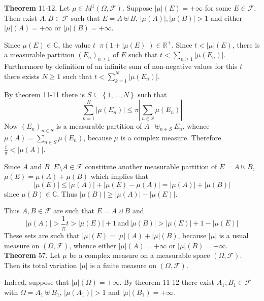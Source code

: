 \documentclass[a4paper]{article}
\newcommand{\obj}[1]{\left\{ #1 \right \}}
\newcommand{\brac}[1]{\left ( #1 \right )}
\newcommand{\abs}[1]{\left | #1 \right |}
\newcommand{\Real}{\mathbb{R}}
\newcommand{\Cplx}{\mathbb{C}}
\newcommand{\Fcal}{\mathcal{F}}
\newcommand{\defn}{\mathop{\overset{\Delta}{=}}\nolimits}
\begin{document}
\label{thm:inf_tot_var_lemma} \noindent \textbf{Theorem} 11-12.
Let $\mu \in M^1\brac{\Omega, \Fcal}$. Suppose $\abs{\mu}\brac{E} = +\infty$ for some $E\in \Fcal$. Then exist $A,B\in \Fcal$ such that $E=A\uplus B$, $\abs{\mu\brac{A}}, \abs{\mu\brac{B}}>1$ and either $\abs{\mu}\brac{A} = +\infty$ or $\abs{\mu}\brac{B}=+\infty$.

Since $\mu\brac{E}\in \Cplx$, the value $t\defn \pi \brac{ 1 + \abs{\mu\brac{E}}}\in \Real^+$. Since $t<\abs{\mu}\brac{E}$, there is a measurable partition $\brac{E_n}_{n\geq1}$ of $E$ such that $t < \sum_{n\geq 1} \abs{\mu\brac{E_n}}$. Furthermore by definition of an infinite sum of non-negative values for this $t$ there exists $N\geq 1$ such that $t<\sum_{k=1}^N \abs{\mu\brac{E_n}}$.

By theorem 11-11 there is $S\subseteq \obj{1,\ldots, N}$ such that \[\sum_{k=1}^N \abs{\mu\brac{E_n}} \leq \pi \abs{ \sum_{n\in S} \mu\brac{E_n} }\] Now $\brac{E_n}_{n\in S}$ is a measurable partition of $A\defn \uplus_{n\in S} E_n$, whence $\mu\brac{A}=\sum_{n\in S} \mu\brac{E_n}$, because $\mu$ is a complex measure. Therefore $\frac{t}{\pi}<\abs{\mu\brac{A}}$.

Since $A$ and $B\defn E\setminus A\in \Fcal$ constitute another measurable partition of  $E=A\uplus B$, $\mu\brac{E}=\mu\brac{A}+\mu\brac{B}$ which implies that \[\abs{\mu\brac{E}}\leq \abs{\mu\brac{A}}+\abs{\mu\brac{E}-\mu\brac{A}} = \abs{\mu\brac{A}}+\abs{\mu\brac{B}}\] since $\mu\brac{B}\in \Cplx$. Thus $\abs{\mu\brac{B}}\geq \abs{\mu\brac{A}}-\abs{\mu\brac{E}}$.

Thus $A,B\in\Fcal$ are such that $E=A\uplus B$ and \[\abs{\mu\brac{A}}>\frac{1}{\pi} t > \abs{\mu\brac{E}} + 1\,\text{and}\,\abs{\mu\brac{B}} > \abs{\mu\brac{E}} + 1 - \abs{\mu\brac{E}}\] These sets are such that $\abs{\mu}\brac{E}=\abs{\mu}\brac{A}+\abs{\mu}\brac{B}$, because $\abs{\mu}$ is a usual measure on $\brac{\Omega, \Fcal}$, whence either $\abs{\mu}\brac{A}=+\infty$ or $\abs{\mu}\brac{B}=+\infty$.\\

\label{thm:tot_var_finte_meas} \noindent \textbf{Theorem} 57.
Let $\mu$ be a complex measure on a measurable space $\brac{\Omega, \Fcal}$. Then its total variation $\abs{\mu}$ is a finite measure on $\brac{\Omega, \Fcal}$.

Indeed, suppose that $\abs{\mu}\brac{\Omega}=+\infty$. By theorem 11-12 there exist $A_1, B_1\in \Fcal$ with $\Omega = A_1\uplus B_1$, $\abs{\mu\brac{A_1}}>1$ and $\abs{\mu}\brac{B_1}=+\infty$.
\end{document}
